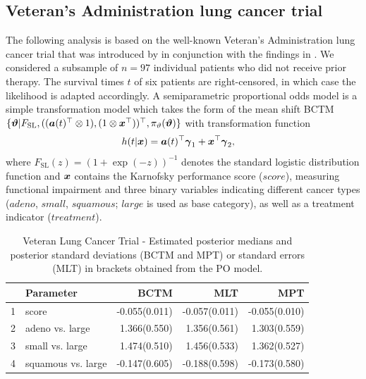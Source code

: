 \documentclass[12pt, a4paper]{article}
\begin{document}
\newpage

\subsection{Veteran's Administration lung cancer trial}\label{sec:cancer}

The following analysis is based on the well-known Veteran's Administration lung cancer trial that was introduced by \cite{prentice1973exponential} in conjunction with the findings in \cite{hanson2007bayesian}. We considered a subsample of $n=97$ individual patients who did not receive prior therapy. The survival times $t$ of six patients are right-censored, in which case the likelihood is adapted accordingly. A semiparametric proportional odds model is a simple transformation model which takes the form of the mean shift BCTM $\lbrace \text{\boldmath$\vartheta$} |F_{\text{SL}}, ((\text{\boldmath$a$}(t)^\top \otimes 1),  (1 \otimes  \text{\boldmath$x$}^\top))^\top, \pi_\vartheta(\text{\boldmath$\vartheta$})\rbrace$ with transformation function
\begin{align*}
h(t|\text{\boldmath$x$}) &= \text{\boldmath$a$}(t)^\top \text{\boldmath$\gamma$}_1 + \text{\boldmath$x$}^\top \text{\boldmath$\gamma$}_2,
\end{align*}
where $F_{\text{SL}}(z)=(1+\exp(-z))^{-1}$ denotes the standard logistic distribution function and $\text{\boldmath$x$}$ contains the Karnofsky performance score ($score$), measuring functional impairment and three binary variables indicating different cancer types ($\mathit{adeno}$, $\mathit{small}$, $\mathit{squamous}$; $\mathit{large}$ is used as base category), as well as a treatment indicator ($treatment$).
\begin{table}
\begin{center}
\begin{tabular}{rlrrr}
  \hline \hline
 & Parameter & BCTM & MLT & MPT \\
  \hline
1 & score & -0.055(0.011) & -0.057(0.011) & -0.055(0.010)\\
  2 & adeno vs. large & 1.366(0.550) & 1.356(0.561) & 1.303(0.559)\\
  3 & small vs. large & 1.474(0.510) & 1.456(0.533) & 1.362(0.527)\\
  4 & squamous vs. large & -0.147(0.605) & -0.188(0.598) & -0.173(0.580)\\
   \hline \hline
\end{tabular} \caption{\small Veteran Lung Cancer Trial - Estimated posterior medians and posterior standard deviations (BCTM and MPT) or standard errors (MLT) in brackets obtained from the PO model.}\label{tab:vet}
\end{center}
\end{table}
\end{document}
